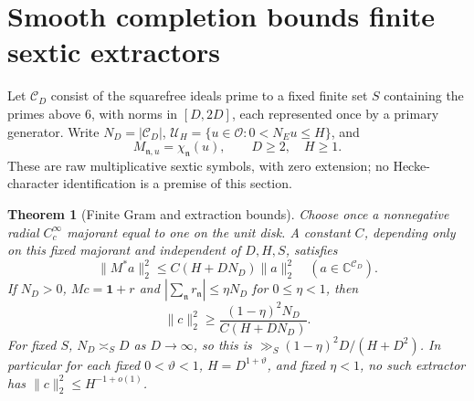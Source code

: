 \documentclass[11pt]{article}
\newtheorem{theorem}{Theorem}
\theoremstyle{remark}\newtheorem{remark}[theorem]{Remark}
\newcommand{\C}{\mathbb C}
\begin{document}
\section{Smooth completion bounds finite sextic extractors}
Let $\mathcal C_D$ consist of the squarefree ideals prime to a fixed
finite set $S$ containing the primes above $6$, with norms in $[D,2D]$,
each represented once by a primary generator. Write
$N_D=|\mathcal C_D|$, $\mathcal U_H=\{u\in\mathcal O:0<N_Eu\le H\}$,
and
\[
 M_{\mathfrak n,u}=\chi_{\mathfrak n}(u),
       \qquad D\ge2,\quad H\ge1.
\]
These are raw multiplicative sextic symbols, with zero extension;
no Hecke-character identification is a premise of this section.

\begin{theorem}[Finite Gram and extraction bounds]\label{thm:finite-gram}
Choose once a nonnegative radial $C_c^\infty$ majorant equal to one
on the unit disk. A constant $C$, depending only on this fixed
majorant and independent of $D,H,S$, satisfies
\[
 \|M^*a\|_2^2\le C(H+DN_D)\|a\|_2^2
                  \quad(a\in\C^{\mathcal C_D}).
\]
If $N_D>0$, $Mc=\mathbf1+r$ and
$|\sum_{\mathfrak n}r_{\mathfrak n}|\le\eta N_D$
for $0\le\eta<1$, then
\[
 \|c\|_2^2\ge
   \frac{(1-\eta)^2N_D}{C(H+DN_D)}.
\]
For fixed $S$, $N_D\asymp_SD$ as $D\to\infty$, so this is
$\gg_S(1-\eta)^2D/(H+D^2)$.
In particular for each fixed $0<\vartheta<1$,
$H=D^{1+\vartheta}$, and fixed $\eta<1$, no such extractor has
$\|c\|_2^2\le H^{-1+o(1)}$.
\end{theorem}
\end{document}
